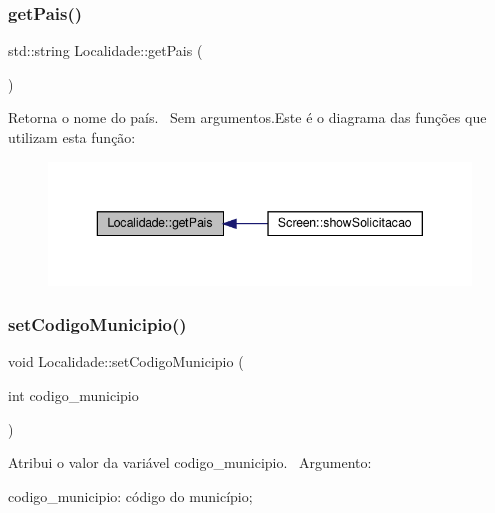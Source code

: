 \subsubsection{\texorpdfstring{get\+Pais()}{getPais()}}
{\footnotesize\ttfamily std\+::string Localidade\+::get\+Pais (\begin{DoxyParamCaption}{ }\end{DoxyParamCaption})}

Retorna o nome do país.~\newline
Sem argumentos.Este é o diagrama das funções que utilizam esta função\+:\nopagebreak
\begin{figure}[H]
\begin{center}
\leavevmode
\includegraphics[width=343pt]{classLocalidade_a03249330040cf75b6a964cced77526cf_icgraph}
\end{center}
\end{figure}
\mbox{\label{classLocalidade_a38bb0027272b4b39b88698dc5820fbc6}} 
\subsubsection{\texorpdfstring{set\+Codigo\+Municipio()}{setCodigoMunicipio()}}
{\footnotesize\ttfamily void Localidade\+::set\+Codigo\+Municipio (\begin{DoxyParamCaption}\item[{int}]{codigo\+\_\+municipio }\end{DoxyParamCaption})}

Atribui o valor da variável codigo\+\_\+municipio.~\newline
 Argumento\+:
\begin{DoxyItemize}
\item codigo\+\_\+municipio\+: código do município;
\end{DoxyItemize}

